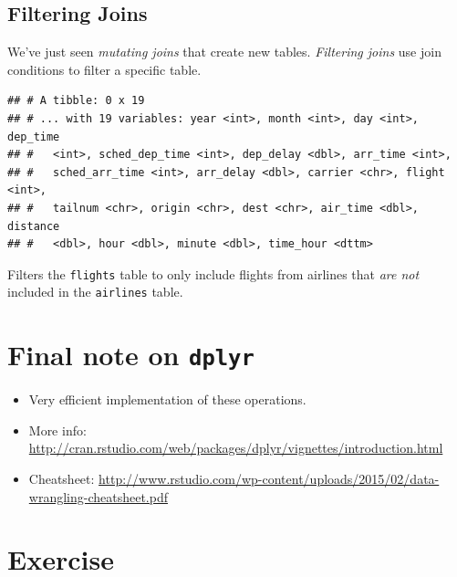 \documentclass[12pt,]{book}
\newenvironment{Shaded}{\begin{snugshade}}{\end{snugshade}}
\newcommand{\KeywordTok}[1]{\textcolor[rgb]{0.13,0.29,0.53}{\textbf{#1}}}
\newcommand{\DataTypeTok}[1]{\textcolor[rgb]{0.13,0.29,0.53}{#1}}
\newcommand{\StringTok}[1]{\textcolor[rgb]{0.31,0.60,0.02}{#1}}
\newcommand{\OperatorTok}[1]{\textcolor[rgb]{0.81,0.36,0.00}{\textbf{#1}}}
\newcommand{\NormalTok}[1]{#1}
\providecommand{\tightlist}{%
  \setlength{\itemsep}{0pt}\setlength{\parskip}{0pt}}
\theoremstyle{definition}
\theoremstyle{definition}
\theoremstyle{definition}
\theoremstyle{remark}
\begin{document}
\subsection{Filtering Joins}\label{filtering-joins}

We've just seen \emph{mutating joins} that create new tables.
\emph{Filtering joins} use join conditions to filter a specific table.

\begin{Shaded}
\end{Shaded}

\begin{verbatim}
## # A tibble: 0 x 19
## # ... with 19 variables: year <int>, month <int>, day <int>, dep_time
## #   <int>, sched_dep_time <int>, dep_delay <dbl>, arr_time <int>,
## #   sched_arr_time <int>, arr_delay <dbl>, carrier <chr>, flight <int>,
## #   tailnum <chr>, origin <chr>, dest <chr>, air_time <dbl>, distance
## #   <dbl>, hour <dbl>, minute <dbl>, time_hour <dttm>
\end{verbatim}

Filters the \texttt{flights} table to only include flights from airlines
that \emph{are not} included in the \texttt{airlines} table.

\section{\texorpdfstring{Final note on
\texttt{dplyr}}{Final note on dplyr}}\label{final-note-on-dplyr}

\begin{itemize}
\tightlist
\item
  Very efficient implementation of these operations.
\item
  More info:
  \url{http://cran.rstudio.com/web/packages/dplyr/vignettes/introduction.html}
\item
  Cheatsheet:
  \url{http://www.rstudio.com/wp-content/uploads/2015/02/data-wrangling-cheatsheet.pdf}
\end{itemize}

\section{Exercise}\label{exercise}
\end{document}
